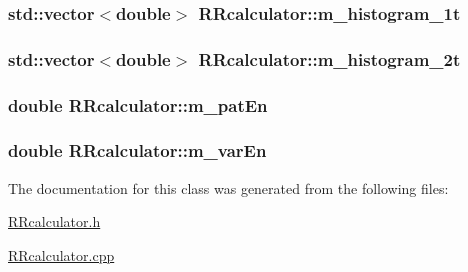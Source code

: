 \hypertarget{class_r_rcalculator_a88044253bb67963b690efe03b4566461}{
\subsubsection[{m\+\_\+histogram\+\_\+1t}]{\setlength{\rightskip}{0pt plus 5cm}std\+::vector$<$double$>$ R\+Rcalculator\+::m\+\_\+histogram\+\_\+1t}}\label{class_r_rcalculator_a88044253bb67963b690efe03b4566461}
\hypertarget{class_r_rcalculator_a22fd8fedd28bf0b6455eb3a7ade48960}{
\subsubsection[{m\+\_\+histogram\+\_\+2t}]{\setlength{\rightskip}{0pt plus 5cm}std\+::vector$<$double$>$ R\+Rcalculator\+::m\+\_\+histogram\+\_\+2t}}\label{class_r_rcalculator_a22fd8fedd28bf0b6455eb3a7ade48960}
\hypertarget{class_r_rcalculator_ab2de224108c8ae0611b0a8b12cf9ce1f}{
\subsubsection[{m\+\_\+pat\+En}]{\setlength{\rightskip}{0pt plus 5cm}double R\+Rcalculator\+::m\+\_\+pat\+En}}\label{class_r_rcalculator_ab2de224108c8ae0611b0a8b12cf9ce1f}
\hypertarget{class_r_rcalculator_a94f0e6781def8bd5e38124e3144d3acc}{
\subsubsection[{m\+\_\+var\+En}]{\setlength{\rightskip}{0pt plus 5cm}double R\+Rcalculator\+::m\+\_\+var\+En}}\label{class_r_rcalculator_a94f0e6781def8bd5e38124e3144d3acc}


The documentation for this class was generated from the following files\+:\begin{DoxyCompactItemize}
\item 
\hyperlink{_r_rcalculator_8h}{R\+Rcalculator.\+h}\item 
\hyperlink{_r_rcalculator_8cpp}{R\+Rcalculator.\+cpp}\end{DoxyCompactItemize}
